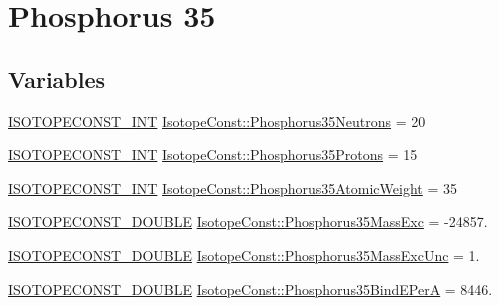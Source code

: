 \hypertarget{group___isotope_const-_phosphorus-_p35}{}\section{Phosphorus 35}
\label{group___isotope_const-_phosphorus-_p35}
\subsection*{Variables}
\begin{DoxyCompactItemize}
\item 
\mbox{\hyperlink{group___isotope_const-_macros_ga5f18360b3e99483a35c32d789e62621c}{I\+S\+O\+T\+O\+P\+E\+C\+O\+N\+S\+T\+\_\+\+I\+NT}} \mbox{\hyperlink{group___isotope_const-_phosphorus-_p35_gab7d2c68b960fece77c1aac732d9d2b31}{Isotope\+Const\+::\+Phosphorus35\+Neutrons}} = 20
\item 
\mbox{\hyperlink{group___isotope_const-_macros_ga5f18360b3e99483a35c32d789e62621c}{I\+S\+O\+T\+O\+P\+E\+C\+O\+N\+S\+T\+\_\+\+I\+NT}} \mbox{\hyperlink{group___isotope_const-_phosphorus-_p35_gaad537bcc521de931dbdc0ec5d6808e2d}{Isotope\+Const\+::\+Phosphorus35\+Protons}} = 15
\item 
\mbox{\hyperlink{group___isotope_const-_macros_ga5f18360b3e99483a35c32d789e62621c}{I\+S\+O\+T\+O\+P\+E\+C\+O\+N\+S\+T\+\_\+\+I\+NT}} \mbox{\hyperlink{group___isotope_const-_phosphorus-_p35_gad01a86347b86b9b65ff7bbb74ddfff47}{Isotope\+Const\+::\+Phosphorus35\+Atomic\+Weight}} = 35
\item 
\mbox{\hyperlink{group___isotope_const-_macros_ga8f45a7272ce02c0b4c65c44636ed719a}{I\+S\+O\+T\+O\+P\+E\+C\+O\+N\+S\+T\+\_\+\+D\+O\+U\+B\+LE}} \mbox{\hyperlink{group___isotope_const-_phosphorus-_p35_ga22daced46eeb781a0d5068e5f9c62fb9}{Isotope\+Const\+::\+Phosphorus35\+Mass\+Exc}} = -\/24857.
\item 
\mbox{\hyperlink{group___isotope_const-_macros_ga8f45a7272ce02c0b4c65c44636ed719a}{I\+S\+O\+T\+O\+P\+E\+C\+O\+N\+S\+T\+\_\+\+D\+O\+U\+B\+LE}} \mbox{\hyperlink{group___isotope_const-_phosphorus-_p35_ga619e17dcf00bc3bf5b2ca5e6a9aa3495}{Isotope\+Const\+::\+Phosphorus35\+Mass\+Exc\+Unc}} = 1.
\item 
\mbox{\hyperlink{group___isotope_const-_macros_ga8f45a7272ce02c0b4c65c44636ed719a}{I\+S\+O\+T\+O\+P\+E\+C\+O\+N\+S\+T\+\_\+\+D\+O\+U\+B\+LE}} \mbox{\hyperlink{group___isotope_const-_phosphorus-_p35_gac97c6063beba9404da470d5dcb517b99}{Isotope\+Const\+::\+Phosphorus35\+Bind\+E\+PerA}} = 8446.
\item 

\end{DoxyCompactItemize}
